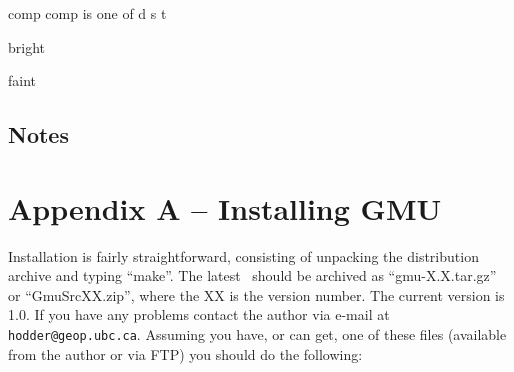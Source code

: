 \documentclass[11pt,twoside]{article}
\begin{document}
\begin{clo}{comp}
comp is one of d s t
\end{clo}

\begin{clo}{bright}

\end{clo}

\begin{clo}{faint}

\end{clo}


\subsection*{Notes}






\newpage
\section*{Appendix A -- Installing GMU}

Installation is fairly straightforward, consisting of unpacking the 
distribution archive and typing ``make''. The latest \gmu\ should be archived
as ``gmu-X.X.tar.gz'' or ``GmuSrcXX.zip'', where the XX is the version number.
The current version is 1.0. If you have any problems contact the author via 
e-mail at {\tt hodder@geop.ubc.ca}. Assuming you have, or can get, one of
these files (available from the author or via FTP) you should do the following:
\end{document}
